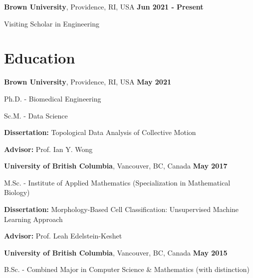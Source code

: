 \documentclass[margin,line]{res}
\newenvironment{list1}{
  \begin{list}{\ding{113}}{
      \setlength{\itemsep}{0in}
      \setlength{\parsep}{0in} \setlength{\parskip}{0in}
      \setlength{\topsep}{0in} \setlength{\partopsep}{0in}
      \setlength{\leftmargin}{0.17in}}}{\end{list}}
\begin{document}
\begin{resume}
{\bf Brown University}, Providence, RI, USA  \hfill {\bf Jun 2021 - Present}\\
\vspace*{-.2cm}
\begin{list1}
\item[] Visiting Scholar in Engineering
\end{list1}

\vspace*{.08cm}

\section{\sc Education}

{\bf Brown University}, Providence, RI, USA  \hfill {\bf May 2021}\\
\vspace*{-.2cm}
\begin{list1}
\setlength\itemsep{0.15em}
\item[] Ph.D. - Biomedical Engineering
\item[] Sc.M. - Data Science
\vspace*{.1cm}
\item[] {\bf Dissertation:} Topological Data Analysis of Collective Motion
\vspace*{.1cm}
\item[] {\bf Advisor:} Prof. Ian Y. Wong
\end{list1}
\vspace*{.12cm}

{\bf University of British Columbia}, Vancouver, BC, Canada  \hfill {\bf May 2017}\\
\vspace*{-.2cm}
\begin{list1}
\item[] M.Sc. - Institute of Applied Mathematics (Specialization in Mathematical Biology)
\vspace*{.1cm}
\item[] {\bf Dissertation:} Morphology-Based Cell Classification: Unsupervised Machine Learning Approach
\vspace*{-0.3cm}
\item[] {\bf Advisor:} Prof. Leah Edelstein-Keshet
\end{list1}
\vspace*{.12cm}

{\bf University of British Columbia}, Vancouver, BC, Canada  \hfill {\bf May 2015}\\
\vspace*{-.2cm}
\begin{list1}
\item[] B.Sc. - Combined Major in Computer Science \& Mathematics (with distinction)
\end{list1}


\end{resume}
\end{document}
